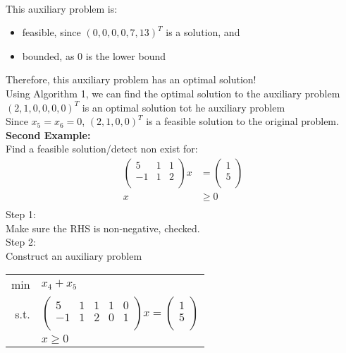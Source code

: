 \documentclass[letterpaper, 12pt]{article}
\newcommand{\red}[1]{{\color{red}{#1}}}
\begin{document}
    \red{Remark:}\\
    This auxiliary problem is:\\
    \begin{itemize}
        \item feasible, since $(0, 0, 0, 0, 7, 13)^T$ is a solution, and
        \item bounded, as 0 is the lower bound
    \end{itemize}
    Therefore, this auxiliary problem has an optimal solution!\\
    Using Algorithm 1, we can find the optimal solution to the auxiliary problem\\
    \bigskip
    $(2, 1, 0, 0, 0, 0)^T$ is an optimal solution tot he auxiliary problem\\
    Since $x_5 = x_6 = 0$, $(2,1,0,0)^T$ is a feasible solution to the original problem.\\
    \bigskip
    \textbf{Second Example:}\\
    Find a feasible solution/detect non exist for:\\
    \begin{align*}
        \begin{pmatrix}
            5 & 1 & 1\\
            -1 & 1 & 2\\
        \end{pmatrix}x &= \begin{pmatrix}
            1\\5\\
        \end{pmatrix}\\
        x &\geq 0\\
    \end{align*}
    Step 1:\\
    Make sure the RHS is non-negative, checked.\\
    Step 2:\\
    Construct an auxiliary problem\\
    \begin{center}
        \begin{tabular}{rl}
            min & $x_4 + x_5$\\
            s.t.& $\begin{pmatrix}
                5 & 1 & 1 & 1 & 0\\
                -1 & 1 & 2 & 0 & 1\\
            \end{pmatrix}x = \begin{pmatrix}
                1\\5\\
            \end{pmatrix}$\\
            & $x \geq 0$\\
        \end{tabular}
    \end{center}
\end{document}
